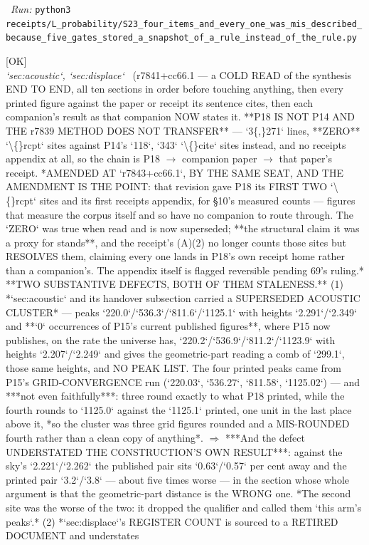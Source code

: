 \begin{description}
\ \emph{Run:} \texttt{python3 receipts/L\_probability/S23\_four\_items\_and\_every\_one\_was\_mis\_described\_because\_five\_gates\_stored\_a\_snapshot\_of\_a\_rule\_instead\_of\_the\_rule.py}
\item[\rcptlabel{P18_every_figure_traces_to_its_companion_and_the_two_defects_are_a_superseded_acoustic_cluster_and_a_register_count_from_a_retired_document}{P18R1}\textbf{P18R1}\quad\texttt{P18\_every\_figure\_traces\_to\_its\_companion\_and\_the\_two\_defects\_are\_a\_superseded\_acoustic\_cluster\_and\_a\_register\_count\_from\_a\_retired\_document}]\hfill\textsf{[OK]}\\
\textit{`sec:acoustic`, `sec:displace`} \ (r7841+cc66.1 --- a COLD READ of the synthesis END TO END, all ten sections in order before touching anything, then every printed figure against the paper or receipt its sentence cites, then each companion's result as that companion NOW states it.  **P18 IS NOT P14 AND THE r7839 METHOD DOES NOT TRANSFER** --- `3\{,\}271` lines, **ZERO** `\textbackslash\{\}rcpt` sites against P14's `118`, `343` `\textbackslash\{\}cite` sites instead, and no receipts appendix at all, so the chain is P18 \ensuremath{\to} companion paper \ensuremath{\to} that paper's receipt.  *AMENDED AT `r7843+cc66.1`, BY THE SAME SEAT, AND THE AMENDMENT IS THE POINT: that revision gave P18 its FIRST TWO `\textbackslash\{\}rcpt` sites and its first receipts appendix, for \S{}10's measured counts --- figures that measure the corpus itself and so have no companion to route through. The `ZERO` was true when read and is now superseded; **the structural claim it was a proxy for stands**, and the receipt's (A)(2) no longer counts those sites but RESOLVES them, claiming every one lands in P18's own receipt home rather than a companion's. The appendix itself is flagged reversible pending 69's ruling.*  **TWO SUBSTANTIVE DEFECTS, BOTH OF THEM STALENESS.** (1) *`sec:acoustic` and its handover subsection carried a SUPERSEDED ACOUSTIC CLUSTER* --- peaks `220.0`/`536.3`/`811.6`/`1125.1` with heights `2.291`/`2.349` and **`0` occurrences of P15's current published figures**, where P15 now publishes, on the rate the universe has, `220.2`/`536.9`/`811.2`/`1123.9` with heights `2.207`/`2.249` and gives the geometric-part reading a comb of `299.1`, those same heights, and NO PEAK LIST. The four printed peaks came from P15's GRID-CONVERGENCE run (`220.03`, `536.27`, `811.58`, `1125.02`) --- and ***not even faithfully***: three round exactly to what P18 printed, while the fourth rounds to `1125.0` against the `1125.1` printed, one unit in the last place above it, *so the cluster was three grid figures rounded and a MIS-ROUNDED fourth rather than a clean copy of anything*. \ensuremath{\Rightarrow} ***And the defect UNDERSTATED THE CONSTRUCTION'S OWN RESULT***: against the sky's `2.221`/`2.262` the published pair sits `0.63`/`0.57` per cent away and the printed pair `3.2`/`3.8` --- about five times worse --- in the section whose whole argument is that the geometric-part distance is the WRONG one. *The second site was the worse of the two: it dropped the qualifier and called them `this arm's peaks`.* (2) *`sec:displace`'s REGISTER COUNT is sourced to a RETIRED DOCUMENT and understates 
\end{description}
